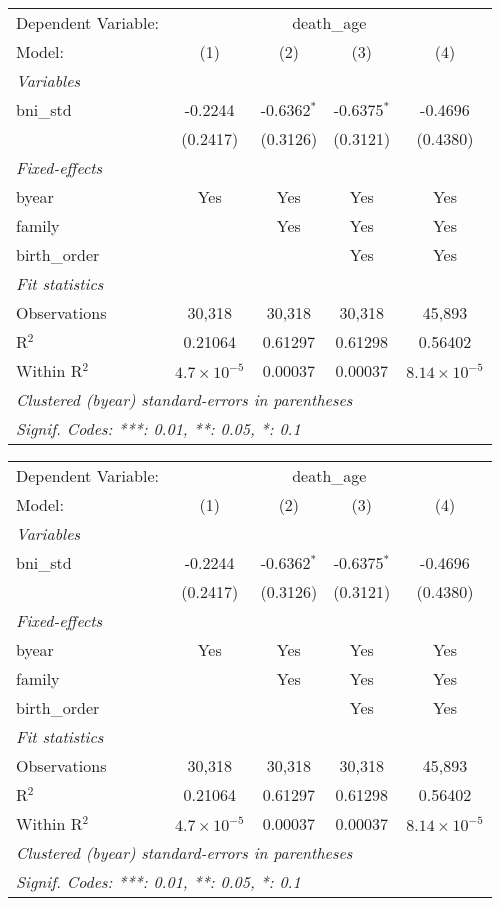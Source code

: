 \begin{tabular}{lcccc}
\tabularnewline\midrule\midrule
Dependent Variable: & \multicolumn{4}{c}{death\_age}\\
Model: & (1) & (2) & (3) & (4)\\
\midrule \emph{Variables} &   &   &   &  \\
bni\_std & -0.2244 & -0.6362$^{*}$ & -0.6375$^{*}$ & -0.4696\\
  & (0.2417) & (0.3126) & (0.3121) & (0.4380)\\
\midrule \emph{Fixed-effects} &   &   &   &  \\
byear & Yes & Yes & Yes & Yes\\
family &  & Yes & Yes & Yes\\
birth\_order &  &  & Yes & Yes\\
\midrule \emph{Fit statistics} &   &   &   &  \\
Observations & 30,318 & 30,318 & 30,318 & 45,893\\
R$^2$ & 0.21064 & 0.61297 & 0.61298 & 0.56402\\
Within R$^2$ & $4.7\times 10^{-5}$ & 0.00037 & 0.00037 & $8.14\times 10^{-5}$\\
\midrule\midrule\multicolumn{5}{l}{\emph{Clustered (byear) standard-errors in parentheses}}\\
\multicolumn{5}{l}{\emph{Signif. Codes: ***: 0.01, **: 0.05, *: 0.1}}\\
\end{tabular}



\begin{tabular}{lcccc}
\tabularnewline\midrule\midrule
Dependent Variable: & \multicolumn{4}{c}{death\_age}\\
Model: & (1) & (2) & (3) & (4)\\
\midrule \emph{Variables} &   &   &   &  \\
bni\_std & -0.2244 & -0.6362$^{*}$ & -0.6375$^{*}$ & -0.4696\\
  & (0.2417) & (0.3126) & (0.3121) & (0.4380)\\
\midrule \emph{Fixed-effects} &   &   &   &  \\
byear & Yes & Yes & Yes & Yes\\
family &  & Yes & Yes & Yes\\
birth\_order &  &  & Yes & Yes\\
\midrule \emph{Fit statistics} &   &   &   &  \\
Observations & 30,318 & 30,318 & 30,318 & 45,893\\
R$^2$ & 0.21064 & 0.61297 & 0.61298 & 0.56402\\
Within R$^2$ & $4.7\times 10^{-5}$ & 0.00037 & 0.00037 & $8.14\times 10^{-5}$\\
\midrule\midrule\multicolumn{5}{l}{\emph{Clustered (byear) standard-errors in parentheses}}\\
\multicolumn{5}{l}{\emph{Signif. Codes: ***: 0.01, **: 0.05, *: 0.1}}\\
\end{tabular}



